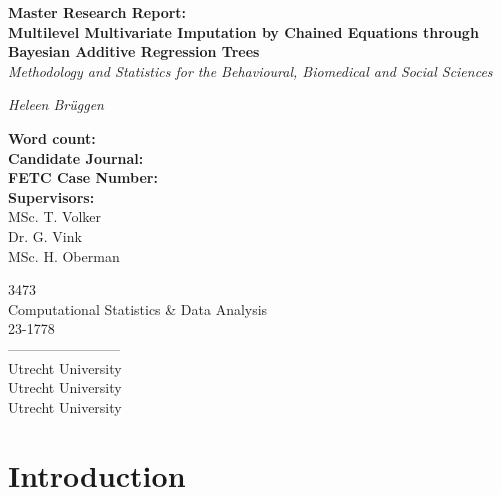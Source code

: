 \documentclass[10pt, a4paper, titlepage]{article}
\begin{document}
\begin{titlingpage}
\begin{center}
\Huge\textbf{Master Research Report:  \\ Multilevel Multivariate Imputation by Chained Equations through Bayesian Additive Regression Trees} \\
\Large\textit{Methodology and Statistics for the Behavioural, Biomedical and Social Sciences}

\vspace{.5cm}

\normalsize\textit{Heleen Brüggen}

\vspace{15cm}

\begin{minipage}{0.5\textwidth}
\begin{flushleft}

\textbf{Word count:} \\
\textbf{Candidate Journal:} \\
\textbf{FETC Case Number:} \\
\textbf{Supervisors:} \\
MSc. T. Volker \\
Dr. G. Vink \\
 MSc. H. Oberman
\end{flushleft}
\end{minipage}%
\begin{minipage}{0.5\textwidth}
\begin{flushright}

3473 \\
Computational Statistics \& Data Analysis \\
23-1778 \\
------------------------\\
Utrecht University \\
Utrecht University \\
Utrecht University
\end{flushright}
\end{minipage}

\end{center}
\end{titlingpage}

\newpage

\section{Introduction}
\end{document}
